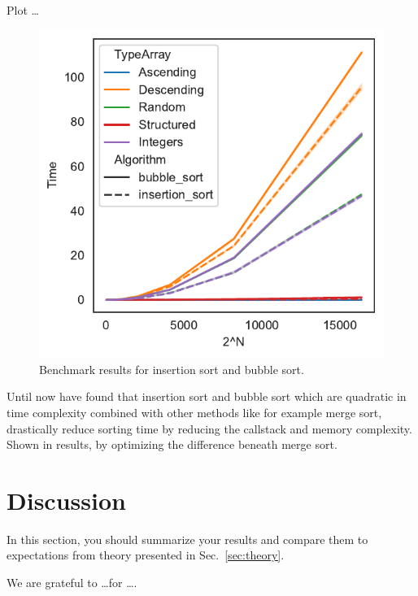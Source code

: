 \documentclass[sigconf, nonacm, natbib, screen, balance=False]{acmart}
\begin{document}
Plot \dots

\begin{figure}
  \centering
  \includegraphics{foo}
  \caption{Benchmark results for insertion sort and bubble sort.}
  \label{fig:bench}
\end{figure}

Until now have found that insertion sort and bubble sort which are quadratic in time complexity combined with other methods like for example merge sort, drastically reduce sorting time by reducing the callstack and memory complexity. Shown in results, by optimizing the difference beneath merge sort.

\section{Discussion}\label{sec:discussion}

In this section, you should summarize your results and compare them to
expectations from theory presented in Sec.~\ref{sec:theory}.

\begin{acks}
We are grateful to \dots for \dots.
\end{acks}






\end{document}
